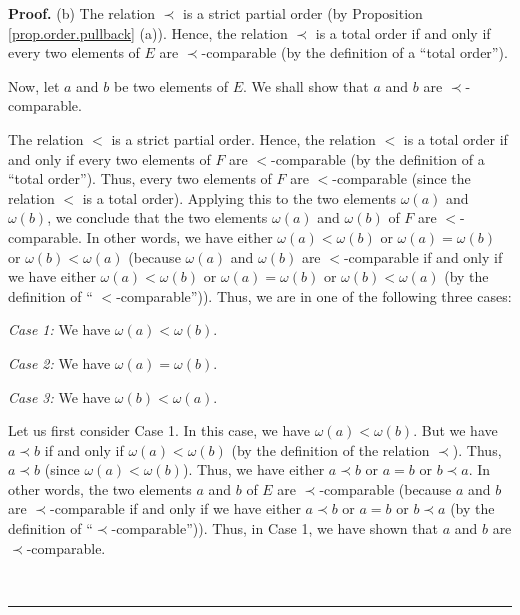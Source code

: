 \documentclass[numbers=enddot,12pt,final,onecolumn,notitlepage,abstracton]{scrartcl}
\theoremstyle{definition}
\newenvironment{proof}[1][Proof]{\noindent\textbf{#1.} }{\ \rule{0.5em}{0.5em}}
\newenvironment{verlong}{}{}
\newenvironment{noncompile}{}{}
\begin{document}
\begin{verlong}
\begin{footnotesize}
\begin{noncompile}
\begin{proof}
(b) The relation $\prec$ is a strict partial order (by Proposition
\ref{prop.order.pullback} (a)). Hence, the relation $\prec$ is a total order
if and only if every two elements of $E$ are $\prec$-comparable (by the
definition of a \textquotedblleft total order\textquotedblright).

Now, let $a$ and $b$ be two elements of $E$. We shall show that $a$ and $b$
are $\prec$-comparable.

The relation $<$ is a strict partial order. Hence, the relation $<$ is a total
order if and only if every two elements of $F$ are $<$-comparable (by the
definition of a \textquotedblleft total order\textquotedblright). Thus, every
two elements of $F$ are $<$-comparable (since the relation $<$ is a total
order). Applying this to the two elements $\omega\left(  a\right)  $ and
$\omega\left(  b\right)  $, we conclude that the two elements $\omega\left(
a\right)  $ and $\omega\left(  b\right)  $ of $F$ are $<$-comparable. In other
words, we have either $\omega\left(  a\right)  <\omega\left(  b\right)  $ or
$\omega\left(  a\right)  =\omega\left(  b\right)  $ or $\omega\left(
b\right)  <\omega\left(  a\right)  $ (because $\omega\left(  a\right)  $ and
$\omega\left(  b\right)  $ are $<$-comparable if and only if we have either
$\omega\left(  a\right)  <\omega\left(  b\right)  $ or $\omega\left(
a\right)  =\omega\left(  b\right)  $ or $\omega\left(  b\right)
<\omega\left(  a\right)  $ (by the definition of \textquotedblleft%
$<$-comparable\textquotedblright)). Thus, we are in one of the following three cases:

\textit{Case 1:} We have $\omega\left(  a\right)  <\omega\left(  b\right)  $.

\textit{Case 2:} We have $\omega\left(  a\right)  =\omega\left(  b\right)  $.

\textit{Case 3:} We have $\omega\left(  b\right)  <\omega\left(  a\right)  $.

Let us first consider Case 1. In this case, we have $\omega\left(  a\right)
<\omega\left(  b\right)  $. But we have $a\prec b$ if and only if
$\omega\left(  a\right)  <\omega\left(  b\right)  $ (by the definition of the
relation $\prec$). Thus, $a\prec b$ (since $\omega\left(  a\right)
<\omega\left(  b\right)  $). Thus, we have either $a\prec b$ or $a=b$ or
$b\prec a$. In other words, the two elements $a$ and $b$ of $E$ are $\prec
$-comparable (because $a$ and $b$ are $\prec$-comparable if and only if we
have either $a\prec b$ or $a=b$ or $b\prec a$ (by the definition of
\textquotedblleft$\prec$-comparable\textquotedblright)). Thus, in Case 1, we
have shown that $a$ and $b$ are $\prec$-comparable.


\end{proof}
\end{noncompile}
\end{footnotesize}
\end{verlong}
\end{document}
